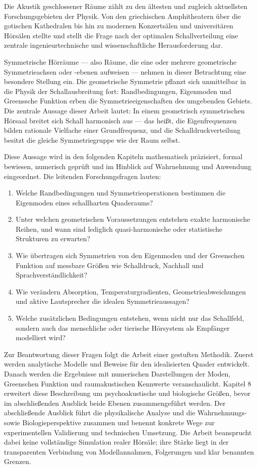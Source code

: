 ﻿\documentclass[12pt, a4paper]{article}
\theoremstyle{definition}
\theoremstyle{remark}
\begin{document}
Die Akustik geschlossener Räume zählt zu den ältesten und zugleich aktuellsten
Forschungsgebieten der Physik. Von den griechischen Amphitheatern über
die gotischen Kathedralen bis hin zu modernen Konzertsälen und universitären
Hörsälen stellte und stellt die Frage nach der optimalen Schallverteilung
eine zentrale ingenieurtechnische und wissenschaftliche Herausforderung dar.

Symmetrische Hörräume --- also Räume, die eine oder mehrere geometrische
Symmetrieachsen oder -ebenen aufweisen --- nehmen in dieser Betrachtung
eine besondere Stellung ein. Die geometrische Symmetrie pflanzt sich
unmittelbar in die Physik der Schallausbreitung fort: Randbedingungen,
Eigenmoden und Greenssche Funktion erben die Symmetrieeigenschaften des
umgebenden Gebiets. Die zentrale Aussage dieser Arbeit lautet: In einem geometrisch symmetrischen Hörsaal breitet sich Schall
harmonisch aus --- das heißt, die Eigenfrequenzen bilden rationale
Vielfache einer Grundfrequenz, und die Schalldruckverteilung besitzt
die gleiche Symmetriegruppe wie der Raum selbst.

Diese Aussage wird in den folgenden Kapiteln mathematisch präzisiert, formal
bewiesen, numerisch geprüft und im Hinblick auf Wahrnehmung und Anwendung eingeordnet.
Die leitenden Forschungsfragen lauten:

\begin{enumerate}
\item Welche Randbedingungen und Symmetrieoperationen bestimmen die Eigenmoden eines
  schallharten Quaderaums?
\item Unter welchen geometrischen Voraussetzungen entstehen exakte harmonische Reihen,
  und wann sind lediglich quasi-harmonische oder statistische Strukturen zu erwarten?
\item Wie übertragen sich Symmetrien von den Eigenmoden und der Greenschen Funktion
  auf messbare Größen wie Schalldruck, Nachhall und Sprachverständlichkeit?
\item Wie verändern Absorption, Temperaturgradienten, Geometrieabweichungen und aktive
  Lautsprecher die idealen Symmetrieaussagen?
\item Welche zusätzlichen Bedingungen entstehen, wenn nicht nur das Schallfeld,
  sondern auch das menschliche oder tierische Hörsystem als Empfänger modelliert wird?
\end{enumerate}

Zur Beantwortung dieser Fragen folgt die Arbeit einer gestuften Methodik. Zuerst werden
analytische Modelle und Beweise für den idealisierten Quader entwickelt. Danach werden
die Ergebnisse mit numerischen Darstellungen der Moden, Greenschen Funktion und
raumakustischen Kennwerte veranschaulicht. Kapitel 8 erweitert diese Beschreibung um
psychoakustische und biologische Größen, bevor im abschließenden Ausblick beide Ebenen
zusammengeführt werden. Der abschließende Ausblick führt die physikalische Analyse und
die Wahrnehmungs- sowie Biologieperspektive zusammen und benennt konkrete Wege zur
experimentellen Validierung und technischen Umsetzung. Die Arbeit beansprucht dabei
keine vollständige Simulation realer Hörsäle; ihre Stärke liegt in der transparenten
Verbindung von Modellannahmen, Folgerungen und klar benannten Grenzen.
\end{document}
